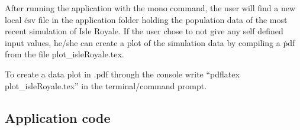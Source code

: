 \documentclass[a4paper]{report}
\begin{document}
After running the application with the mono command, the user will find a new local \.csv file in the application folder holding the population data of the most recent simulation of Isle Royale. If the user chose to not give any self defined input values, he/she can create a plot of the simulation data by compiling a \.pdf from the file plot\_isleRoyale.tex.

To create a data plot in .pdf through the console write “pdflatex plot\_isleRoyale.tex” in the terminal/command prompt.

\subsection*{Application code}
\lstset{language=FSharp}

\end{document}
